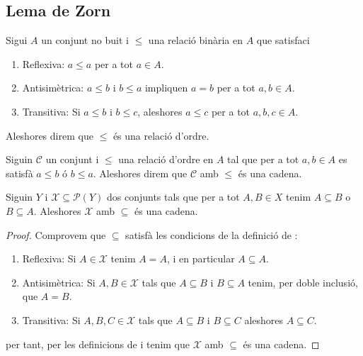 \documentclass[../Apunts.tex]{subfiles}
\begin{document}
	\subsection{Lema de Zorn}
	\begin{definition}
		\label{def:relació d'ordre}
		Sigui \(A\) un conjunt no buit i \(\leq\) una relació binària en \(A\) que satisfaci
		\begin{enumerate}
			\item Reflexiva: \(a\leq a\) per a tot \(a\in A\).
			\item Antisimètrica: \(a\leq b\) i \(b\leq a\) impliquen \(a=b\) per a tot \(a,b\in A\).
			\item Transitiva: Si \(a\leq b\) i \(b\leq c\), aleshores \(a\leq c\) per a tot \(a,b,c\in A\).
		\end{enumerate}
		Aleshores direm que \(\leq\) és una relació d'ordre.
	\end{definition}
	\begin{definition}[Cadena]
		\label{def:cadena}
		Siguin \(\mathcal{C}\) un conjunt i \(\leq\) una relació d'ordre en \(A\) tal que per a tot \(a,b\in A\) es satisfà \(a\leq b\) ó \(b\leq a\). Aleshores direm que \(\mathcal{C}\) amb \(\leq\) és una cadena.
	\end{definition}
	\begin{proposition}
		\label{prop:subconjunts d'un conjunt amb inclusió són una cadena}
		Siguin \(Y\) i \(\mathcal{X}\subseteq\mathcal{P}(Y)\) dos conjunts tals que per a tot \(A,B\in X\) tenim \(A\subseteq B\) o \(B\subseteq A\). Aleshores \(\mathcal{X}\) amb \(\subseteq\) és una cadena.
		\begin{proof}
			Comprovem  que \(\subseteq\) satisfà les condicions de la definició de :
			\begin{enumerate}
				\item Reflexiva: Si \(A\in\mathcal{X}\) tenim \(A=A\), i en particular \(A\subseteq A\). %
				\item Antisimètrica: Si \(A,B\in\mathcal{X}\) tals que \(A\subseteq B\) i \(B\subseteq A\) tenim, per doble inclusió, que \(A=B\). %
				\item Transitiva: Si \(A,B,C\in\mathcal{X}\) tals que \(A\subseteq B\) i \(B\subseteq C\) aleshores \(A\subseteq C\).
			\end{enumerate}
			per tant, per les definicions de  i  tenim que \(\mathcal{X}\) amb \(\subseteq\) és una cadena.
		\end{proof}
	\end{proposition}
\end{document}
